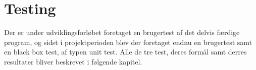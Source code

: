 \chapter{Testing}
Der er under udviklingsforløbet foretaget en brugertest af det delvis færdige program, og sidst i projektperioden blev der foretaget endnu en brugertest samt en black box test, af typen unit test.
Alle de tre test, deres formål samt derres resultater bliver beskrevet i følgende kapitel.




